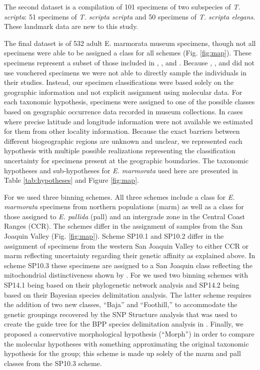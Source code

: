 \documentclass[12pt,letterpaper]{article}
\begin{document}
The second dataset is a compilation of 101 specimens of two subspecies of \textit{T. scripta}: 51 specimens of \textit{T. scripta scripta} and 50 specimens of \textit{T. scripta elegans}. These landmark data are new to this study. 

The final dataset is of 532 adult E. marmorata museum specimens, though not all specimens were able to be assigned a class for all schemes (Fig. \ref{fig:map}). These specimens represent a subset of those included in \citet{Angielczyk2007}, \citet{Angielczyk2011}, and \citet{Angielczyk2013a}. Because  \citet{Spinks2005}, \citet{Spinks2010}, and \citet{Spinks2014} did not use vouchered specimens we were not able to directly sample the individuals in their studies. Instead, our specimen classifications were based solely on the geographic information and not explicit assignment using molecular data. For each taxonomic hypothesis, specimens were assigned to one of the possible classes based on geographic occurrence data recorded in museum collections. In cases where precise latitude and longitude information were not available we estimated for them from other locality information. Because the exact barriers between different biogeographic regions are unknown and unclear, we represented each hypothesis with multiple possible realizations representing the classification uncertainty for specimens present at the geographic boundaries. The taxonomic hypotheses and sub-hypotheses for \textit{E. marmorata} used here are presented in Table \ref{tab:hypotheses} and Figure \ref{fig:map}.

For \citet{Spinks2010} we used three binning schemes. All three schemes include a class for \textit{E. marmorata} specimens from northern populations (marm) as well as a class for those assigned to \textit{E. pallida} (pall) and an intergrade zone in the Central Coast Ranges (CCR). The schemes differ in the assignment of samples from the San Joaquin Valley (Fig. \ref{fig:map}). Scheme SP10.1 and SP10.2 differ in the assignment of specimens from the western San Joaquin Valley to either CCR or marm reflecting uncertainty regarding their genetic affinity as explained above. In scheme SP10.3 these specimens are assigned to a San Joaquin class reflecting the mitochondrial distinctiveness shown by \citet{Spinks2005}. For \citet{Spinks2014} we used two binning schemes with SP14.1 being based on their phylogenetic network analysis and SP14.2 being based on their Bayesian species delimitation analysis. The latter scheme requires the addition of two new classes, ``Baja'' and ``Foothill,'' to accommodate the genetic groupings recovered by the SNP Structure analysis that was used to create the guide tree for the BPP species delimitation analysis in \citet{Spinks2014}. Finally, we proposed a conservative morphological hypothesis (``Morph'') in order to compare the molecular hypotheses with something approximating the original taxonomic hypothesis for the group; this scheme is made up solely of the marm and pall classes from the SP10.3 scheme.
\end{document}
